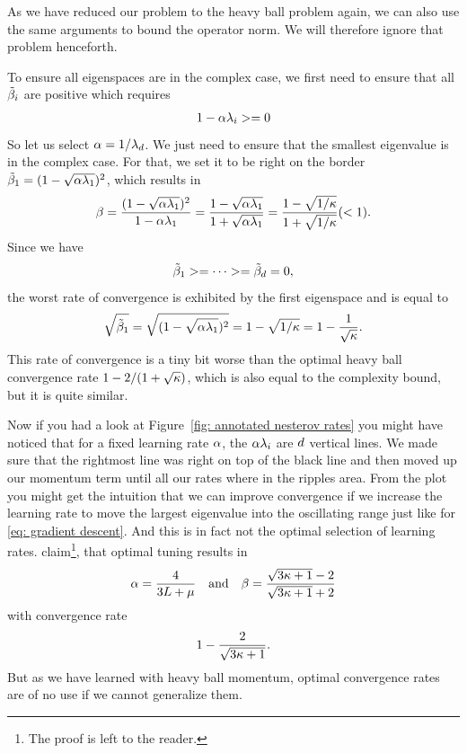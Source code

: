 As we have reduced our problem to the heavy ball problem again, we can also use
the same arguments to bound the operator norm. We will therefore ignore that
problem henceforth.

To ensure all eigenspaces are in the complex case, we first need to ensure that
all \(\tilde{\beta}_i\) are positive which requires
\begin{align*}
	1-\alpha\lambda_i >= 0
\end{align*}
So let us select \(\alpha= 1/\lambda_d\). We just need to ensure
that the smallest eigenvalue is in the complex case. For that, we set it to be
right on the border \(\tilde{\beta}_1=(1-\sqrt{\alpha\lambda_1})^2\),
which results in
\begin{align*}
	\beta = \frac{(1-\sqrt{\alpha\lambda_1})^2}{1-\alpha\lambda_1}
	=\frac{1-\sqrt{\alpha\lambda_1}}{1+\sqrt{\alpha\lambda_1}}
	=\frac{1-\sqrt{1/\kappa}}{1+\sqrt{1/\kappa}} (< 1).
\end{align*}
Since we have
\begin{align*}
	\tilde{\beta}_1 >= \dots >=\tilde{\beta}_d=0,
\end{align*}
the worst rate of convergence is exhibited by the first eigenspace and is equal to
\begin{align}\label{eq: nesterov convegence rate eigenvalue derivation}
	\sqrt{\tilde{\beta}_1} = \sqrt{(1-\sqrt{\alpha\lambda_1})^2}
	= 1-\sqrt{1/\kappa} = 1- \frac{1}{\sqrt{\kappa}}.
\end{align}
%
This rate of convergence is a tiny bit worse than the optimal heavy ball
convergence rate \(1-2/(1+\sqrt{\kappa})\), which is also equal to the
complexity bound, but it is quite similar.

Now if you had a look at Figure~\ref{fig: annotated nesterov rates} you might
have noticed that for a fixed learning rate \(\alpha\), the \(\alpha\lambda_i\)
are \(d\) vertical lines. We made sure
that the rightmost line was right on top of the black line and then moved up
our momentum term until all our rates where in the ripples area. From the
plot you might get the intuition that we can improve convergence if we
increase the learning rate to move the largest eigenvalue into the oscillating
range just like for \ref{eq: gradient descent}. And this is in fact not the optimal
selection of learning rates. \textcite{lessardAnalysisDesignOptimization2016}
claim\footnote{The proof is left to the reader.}, that optimal tuning results in
\begin{align*}
	\alpha = \frac{4}{3L + \mu}
	\quad \text{and} \quad
	\beta = \frac{\sqrt{3\kappa+1}-2}{\sqrt{3\kappa+1}+2}
\end{align*}
with convergence rate
\begin{align*}
	1-\frac{2}{\sqrt{3\kappa+1}}.
\end{align*}
But as we have learned with heavy ball momentum, optimal convergence rates are 
of no use if we cannot generalize them.

